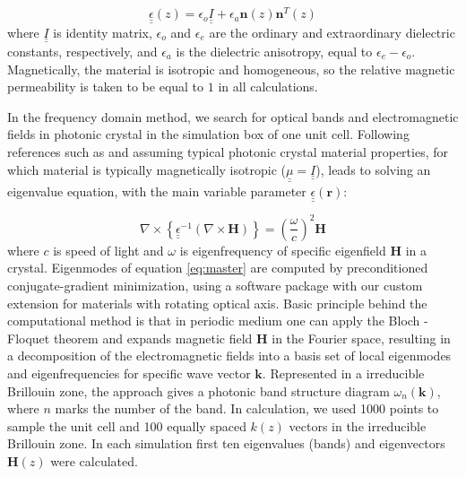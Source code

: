 \documentclass{osa-article}
\renewcommand{\vec}[1]{\mathbf{#1}}
\begin{document}
\begin{equation}
    \underline{\underline{\epsilon}}(z)=\epsilon_o \underline{\underline{I}} + \epsilon_a \vec{n}(z) \vec{n}^T(z)
\label{eq:prve0}
\end{equation}
where $\underline{\underline{I}} $ is identity matrix, $\epsilon_o$ and $\epsilon_e$ are the ordinary and extraordinary dielectric constants, respectively, 
and $\epsilon_a$ is the dielectric anisotropy, equal to $\epsilon_e-\epsilon_o$. 
Magnetically, the material is isotropic and homogeneous, so the relative magnetic permeability is taken to be equal to $1$ in all calculations.

In the frequency domain method, we search for optical bands and electromagnetic fields in photonic crystal in the simulation box of one unit cell. 
Following references such as \cite{book:joa,mpb_algo} and assuming typical photonic crystal material properties, for which
material is typically magnetically isotropic ($\underline{\underline{\mu}}= \underline{\underline{I}}$), leads to
solving an eigenvalue equation, with the main variable parameter
$\underline{\underline{\epsilon}}(\mathbf{r})$:

\begin{equation}
\nabla \times \left\{\underline{\underline{\epsilon}}^{-1} \left(\nabla \times \mathbf{H} \right)
\right\}=\left(\frac{\omega}{c}\right)^2  \mathbf{H}
\label{eq:master}
\end{equation}
where $c$ is speed of light and $\omega$ is eigenfrequency of specific eigenfield $\mathbf{H}$ in a crystal. Eigenmodes of equation \ref{eq:master} are computed by preconditioned conjugate-gradient minimization, using
a software package \cite{mpb_algo} with our custom extension for materials with rotating optical axis.
Basic principle behind the computational method is that in periodic medium one can apply the Bloch - Floquet theorem and
expands magnetic field $\mathbf{H}$ in the Fourier space, resulting in a decomposition of the electromagnetic fields
into a basis set of local eigenmodes and eigenfrequencies for specific wave vector $\mathbf{k}$. 
Represented in a irreducible Brillouin zone, the approach gives
a photonic band structure diagram $\omega_n(\mathbf{k})$, 
where $n$ marks the number of the band. In calculation, we used 1000 points to sample the unit cell and 100 equally spaced $k(z)$ vectors in the irreducible Brillouin
zone. In each simulation first ten eigenvalues (bands) and eigenvectors $\mathbf{H}(z)$ were calculated. 
\end{document}
